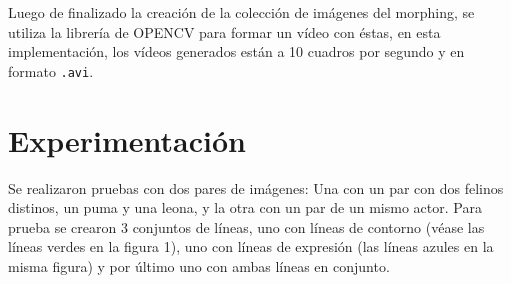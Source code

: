 \documentclass[conference]{IEEEtran}
\begin{document}
	Luego de finalizado la creación de la colección de imágenes del morphing, se utiliza la librería de OPENCV para formar un vídeo con éstas, en esta implementación, los vídeos generados están a 10 cuadros por segundo y en formato \texttt{.avi}.



\section*{Experimentación}
	Se realizaron pruebas con dos pares de imágenes: Una con un par con dos felinos distinos, un puma y una leona, y la otra con un par de un mismo actor. Para prueba se crearon 3 conjuntos de líneas, uno con líneas de contorno (véase las líneas verdes en la figura 1), uno con líneas de expresión (las líneas azules en la misma figura) y por último uno con ambas líneas en conjunto.
	
\end{document}
